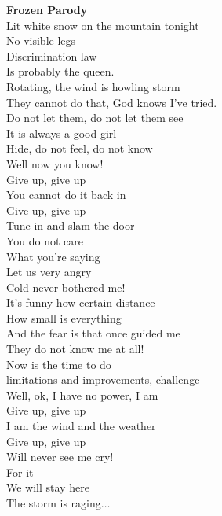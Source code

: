 \documentclass[letterpaper,10pt]{article}
\begin{document}
    
\begin{paracol}{2}
    
\textbf{Frozen Parody}\\

Lit white snow on the mountain tonight\\
No visible legs\\
Discrimination law\\
Is probably the queen.\\

Rotating, the wind is howling storm\\
They cannot do that, God knows I've tried.\\

Do not let them, do not let them see\\
It is always a good girl\\
Hide, do not feel, do not know\\
Well now you know!\\

Give up, give up\\
You cannot do it back in\\
Give up, give up\\
Tune in and slam the door\\

You do not care\\
What you're saying\\
Let us very angry\\
Cold never bothered me!\\

It's funny how certain distance\\
How small is everything\\
And the fear is that once guided me\\
They do not know me at all!\\

Now is the time to do\\
limitations and improvements, challenge\\
Well, ok, I have no power, I am\\

Give up, give up\\
I am the wind and the weather\\
Give up, give up\\
Will never see me cry!\\

For it\\
We will stay here\\
The storm is raging$\ldots$\\


\end{paracol}
\end{document}
